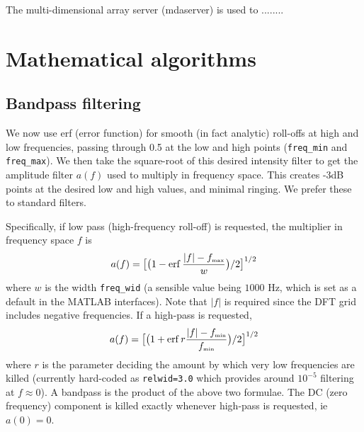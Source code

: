 \documentclass{article}
\newcommand{\be}{\begin{equation}}
\newcommand{\ee}{\end{equation}}
\newcommand{\tbox}[1]{{\mbox{\tiny #1}}}
\DeclareMathOperator{\erf}{erf}
\begin{document}
The multi-dimensional array server (mdaserver) is used to ........





\section{Mathematical algorithms}

\subsection{Bandpass filtering}   %

We now use erf (error function) for smooth (in fact analytic) roll-offs at high and low frequencies,
passing through 0.5 at the low and high points (\verb?freq_min? and \verb?freq_max?).
We then take the square-root of this desired intensity filter to get the amplitude filter $a(f)$
used to multiply in frequency space.
This creates -3dB points at the desired low and high values, and minimal ringing.
We prefer these to standard filters.

Specifically, if low pass (high-frequency roll-off) is requested, the multiplier in frequency space $f$
is
\be
  a(f) = \bigl[\bigl(1-\erf \frac{|f|-f_\tbox{max}}{w}\bigr)/2\bigr]^{1/2}
\ee
where $w$ is the width \verb?freq_wid? (a sensible value being $1000$ Hz, which is set as a default
in the MATLAB interfaces).
Note that $|f|$ is required since the DFT grid includes negative frequencies.
If a high-pass is requested,
\be
  a(f) = \bigl[\bigl(1+\erf r\frac{|f|-f_\tbox{min}}{f_\tbox{min}}\bigr)/2\bigr]^{1/2}
\ee
where $r$ is the parameter deciding the amount by which very low frequencies are killed
(currently hard-coded as \verb?relwid=3.0? which provides around $10^{-5}$ filtering at $f\approx 0$).
A bandpass is the product of the above two formulae.
The DC (zero frequency) component is killed exactly whenever high-pass is requested, ie $a(0)=0$.
\end{document}
